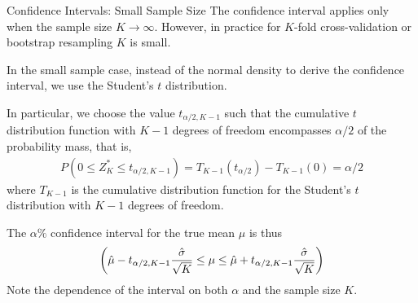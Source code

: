 \begin{frame}{Confidence Intervals: Small Sample Size}
The conf\/{i}dence interval
applies only when the sample
size $K\to \infty$. However, in practice for $K$-fold cross-validation
or bootstrap resampling $K$ is small.

\medskip
In the small sample case, instead of the
normal density to derive the conf\/{i}dence interval, we use the
Student's $t$
distribution. 


\medskip
In particular, we choose the value
$t_{\alpha/2,K-1}$ such that the cumulative $t$ distribution
function with $K-1$ degrees of freedom encompasses $\alpha/2$ of
the probability mass, that is,
\begin{align*}
  P(0 \le Z_K^* \le t_{\alpha/2,K-1}) = T_{K-1}(t_{\alpha/2}) - T_{K-1}(0) =
  \alpha/2
\end{align*}
where $T_{K-1}$ is the cumulative distribution function for the
Student's $t$ distribution with $K-1$ degrees of freedom. 

\medskip
The $\alpha\%$ conf\/{i}dence interval for the true mean $\mu$ is thus
$$\left(\hat{\mu} - t_{\alpha/2,K-1}{\hat{\sigma} \over \sqrt{K}} \le \mu \le
 \hat{\mu} + t_{\alpha/2,K-1}{\hat{\sigma} \over \sqrt{K}} \right)$$
Note the dependence of the interval on both $\alpha$ and the sample size
$K$.
\end{frame}





